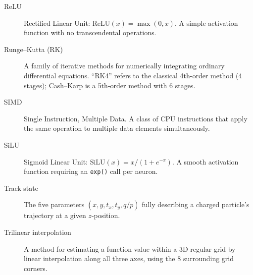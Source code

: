 \documentclass[11pt,a4paper]{article}
\begin{document}
\begin{description}
    \item[ReLU] Rectified Linear Unit: $\text{ReLU}(x) = \max(0, x)$.
        A simple activation function with no transcendental operations.

    \item[Runge--Kutta (RK)] A family of iterative methods for
        numerically integrating ordinary differential equations.
        ``RK4'' refers to the classical 4th-order method (4 stages);
        Cash--Karp is a 5th-order method with 6 stages.

    \item[SIMD] Single Instruction, Multiple Data.  A class of CPU
        instructions that apply the same operation to multiple data
        elements simultaneously.

    \item[SiLU] Sigmoid Linear Unit: $\text{SiLU}(x) = x/(1+e^{-x})$.
        A smooth activation function requiring an \texttt{exp()} call
        per neuron.

    \item[Track state] The five parameters
        $(x, y, t_x, t_y, q/p)$ fully describing a charged particle's
        trajectory at a given $z$-position.

    \item[Trilinear interpolation] A method for estimating a function
        value within a 3D regular grid by linear interpolation along
        all three axes, using the 8 surrounding grid corners.
\end{description}
\end{document}
